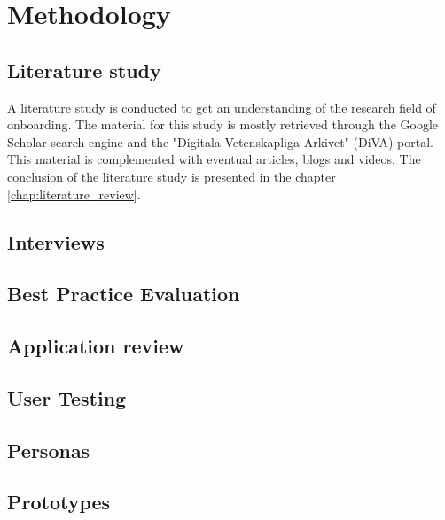\chapter{Methodology}
\label{chap:methodology}

\section{Literature study}
A literature study is conducted to get an understanding of the research field of onboarding. The material for this study is mostly retrieved through the Google Scholar search engine and the "Digitala Vetenskapliga Arkivet" (DiVA) portal. This material is complemented with eventual articles, blogs and videos. The conclusion of the literature study is presented in the chapter \ref{chap:literature_review}.

\section{Interviews}
%
\section{Best Practice Evaluation}
%
\section{Application review}
%
\section{User Testing}
%
\section{Personas}
%
\section{Prototypes}

